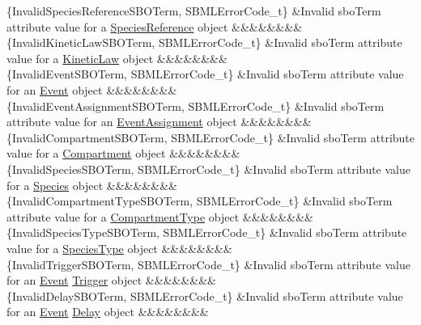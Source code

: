 \begin{DoxyParagraph}{}
\begin{longtabu}
\{Invalid\+Species\+Reference\+S\+B\+O\+Term, S\+B\+M\+L\+Error\+Code\+\_\+t\} &Invalid \textquotesingle{}sbo\+Term\textquotesingle{} attribute value for a \hyperlink{class_species_reference}{Species\+Reference} object &&&&&&&&\\
\{Invalid\+Kinetic\+Law\+S\+B\+O\+Term, S\+B\+M\+L\+Error\+Code\+\_\+t\} &Invalid \textquotesingle{}sbo\+Term\textquotesingle{} attribute value for a \hyperlink{class_kinetic_law}{Kinetic\+Law} object &&&&&&&&\\
\{Invalid\+Event\+S\+B\+O\+Term, S\+B\+M\+L\+Error\+Code\+\_\+t\} &Invalid \textquotesingle{}sbo\+Term\textquotesingle{} attribute value for an \hyperlink{class_event}{Event} object &&&&&&&&\\
\{Invalid\+Event\+Assignment\+S\+B\+O\+Term, S\+B\+M\+L\+Error\+Code\+\_\+t\} &Invalid \textquotesingle{}sbo\+Term\textquotesingle{} attribute value for an \hyperlink{class_event_assignment}{Event\+Assignment} object &&&&&&&&\\
\{Invalid\+Compartment\+S\+B\+O\+Term, S\+B\+M\+L\+Error\+Code\+\_\+t\} &Invalid \textquotesingle{}sbo\+Term\textquotesingle{} attribute value for a \hyperlink{class_compartment}{Compartment} object &&&&&&&&\\
\{Invalid\+Species\+S\+B\+O\+Term, S\+B\+M\+L\+Error\+Code\+\_\+t\} &Invalid \textquotesingle{}sbo\+Term\textquotesingle{} attribute value for a \hyperlink{class_species}{Species} object &&&&&&&&\\
\{Invalid\+Compartment\+Type\+S\+B\+O\+Term, S\+B\+M\+L\+Error\+Code\+\_\+t\} &Invalid \textquotesingle{}sbo\+Term\textquotesingle{} attribute value for a \hyperlink{class_compartment_type}{Compartment\+Type} object &&&&&&&&\\
\{Invalid\+Species\+Type\+S\+B\+O\+Term, S\+B\+M\+L\+Error\+Code\+\_\+t\} &Invalid \textquotesingle{}sbo\+Term\textquotesingle{} attribute value for a \hyperlink{class_species_type}{Species\+Type} object &&&&&&&&\\
\{Invalid\+Trigger\+S\+B\+O\+Term, S\+B\+M\+L\+Error\+Code\+\_\+t\} &Invalid \textquotesingle{}sbo\+Term\textquotesingle{} attribute value for an \hyperlink{class_event}{Event} \hyperlink{class_trigger}{Trigger} object &&&&&&&&\\
\{Invalid\+Delay\+S\+B\+O\+Term, S\+B\+M\+L\+Error\+Code\+\_\+t\} &Invalid \textquotesingle{}sbo\+Term\textquotesingle{} attribute value for an \hyperlink{class_event}{Event} \hyperlink{class_delay}{Delay} object &&&&&&&&\\

\end{longtabu}
\end{DoxyParagraph}
